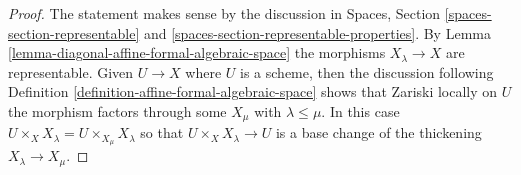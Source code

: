 \documentclass{stacks-project}
\theoremstyle{plain}
\theoremstyle{definition}
\theoremstyle{remark}
\numberwithin{equation}{subsection}
\begin{document}
\begin{proof}
The statement makes sense by the discussion in
Spaces, Section \ref{spaces-section-representable} and
\ref{spaces-section-representable-properties}.
By Lemma \ref{lemma-diagonal-affine-formal-algebraic-space}
the morphisms $X_\lambda \to X$ are representable.
Given $U \to X$ where $U$ is a scheme,
then the discussion following
Definition \ref{definition-affine-formal-algebraic-space}
shows that Zariski locally on $U$ the
morphism factors through some $X_\mu$ with $\lambda \leq \mu$.
In this case $U \times_X X_\lambda = U \times_{X_\mu} X_\lambda$
so that $U \times_X X_\lambda \to U$ is a base change of
the thickening $X_\lambda \to X_\mu$.
\end{proof}
\end{document}

